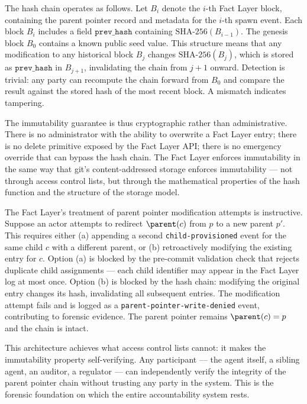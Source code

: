 The hash chain operates as follows. Let $B_i$ denote the $i$-th Fact Layer block, containing the parent pointer record and metadata for the $i$-th spawn event. Each block $B_i$ includes a field $\texttt{prev\_hash}$ containing $\text{SHA-256}(B_{i-1})$. The genesis block $B_0$ contains a known public seed value. This structure means that any modification to any historical block $B_j$ changes $\text{SHA-256}(B_j)$, which is stored as $\texttt{prev\_hash}$ in $B_{j+1}$, invalidating the chain from $j+1$ onward. Detection is trivial: any party can recompute the chain forward from $B_0$ and compare the result against the stored hash of the most recent block. A mismatch indicates tampering.

The immutability guarantee is thus cryptographic rather than administrative. There is no administrator with the ability to overwrite a Fact Layer entry; there is no delete primitive exposed by the Fact Layer API; there is no emergency override that can bypass the hash chain. The Fact Layer enforces immutability in the same way that git's content-addressed storage enforces immutability — not through access control lists, but through the mathematical properties of the hash function and the structure of the storage model.

The Fact Layer's treatment of parent pointer modification attempts is instructive. Suppose an actor attempts to redirect $\parent(c)$ from $p$ to a new parent $p'$. This requires either (a) appending a second \texttt{child-provisioned} event for the same child $c$ with a different parent, or (b) retroactively modifying the existing entry for $c$. Option (a) is blocked by the pre-commit validation check that rejects duplicate child assignments — each child identifier may appear in the Fact Layer log at most once. Option (b) is blocked by the hash chain: modifying the original entry changes its hash, invalidating all subsequent entries. The modification attempt fails and is logged as a \texttt{parent-pointer-write-denied} event, contributing to forensic evidence. The parent pointer remains $\parent(c) = p$ and the chain is intact.

This architecture achieves what access control lists cannot: it makes the immutability property self-verifying. Any participant — the agent itself, a sibling agent, an auditor, a regulator — can independently verify the integrity of the parent pointer chain without trusting any party in the system. This is the forensic foundation on which the entire accountability system rests.

